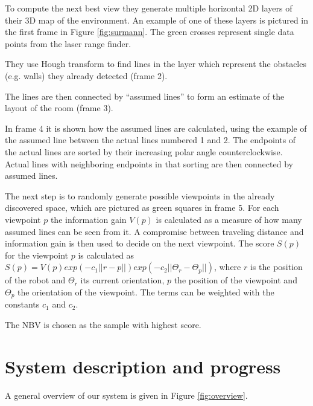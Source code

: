 \documentclass[a4paper,11pt,english]{article}
\begin{document}
To compute the next best view they generate multiple horizontal 2D layers of their 3D map of the environment.
An example of one of these layers is pictured in the first frame in Figure \ref{fig:surmann}.
The green crosses represent single data points from the laser range finder.

They use Hough transform to find lines in the layer which represent the obstacles (e.g. walls) they already detected (frame 2).

The lines are then connected by ``assumed lines'' to form an estimate of the layout of the room (frame 3).

In frame 4 it is shown how the assumed lines are calculated, using the example of the assumed line between the actual lines numbered 1 and 2. 
The endpoints of the actual lines are sorted by their increasing polar angle counterclockwise.
Actual lines with neighboring endpoints in that sorting are then connected by assumed lines.

The next step is to randomly generate possible viewpoints in the already discovered space, which are pictured as green squares in frame 5.
For each viewpoint $p$ the information gain $V(p)$ is calculated as a measure of how many assumed lines can be seen from it.
A compromise between traveling distance and information gain is then used to decide on the next viewpoint.
The score $S(p)$ for the viewpoint $p$ is calculated as $S(p) = V(p) exp(-c_1||r-p||)exp(-c_2||\Theta_r-\Theta_p||)$, where $r$ is the position of the robot and $\Theta_r$ its current orientation, $p$ the position of the viewpoint and $\Theta_p$ the orientation of the viewpoint. The terms can be weighted with the constants $c_1$ and $c_2$.

The NBV is chosen as the sample with highest score.

\section{System description and progress}
\label{system}
A general overview of our system is given in Figure \ref{fig:overview}.
\end{document}
